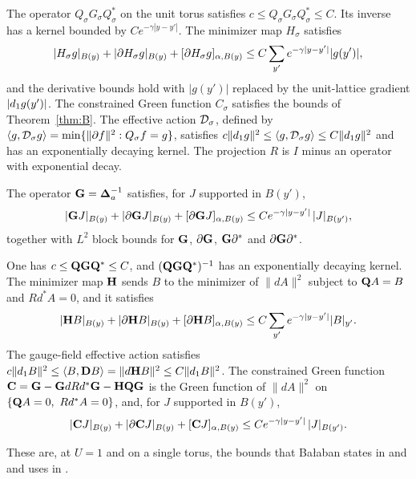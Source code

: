 \begin{maintheorem}\label{thm:C}
The operator $Q_\sigma G_\sigma Q_\sigma^*$ on the unit torus satisfies $c\le Q_\sigma G_\sigma Q_\sigma^*\le C$. Its inverse has a kernel bounded by $Ce^{-\gamma|y-y'|}$. The minimizer map $H_\sigma$ satisfies
\[
|H_\sigma g|_{B(y)}+|\partial H_\sigma g|_{B(y)}+[\partial H_\sigma g]_{\alpha,B(y)}\le C\sum_{y'}e^{-\gamma|y-y'|}|g(y')|,
\]
and the derivative bounds hold with $|g(y')|$ replaced by the unit-lattice gradient $|d_1 g(y')|$. The constrained Green function $C_\sigma$ satisfies the bounds of Theorem~\ref{thm:B}. The effective action $\mathcal D_\sigma$, defined by $\langle g,\mathcal D_\sigma g\rangle=\min\{\|\partial f\|^2:Q_\sigma f=g\}$, satisfies $c\|d_1 g\|^2\le\langle g,\mathcal D_\sigma g\rangle\le C\|d_1 g\|^2$ and has an exponentially decaying kernel. The projection $R$ is $I$ minus an operator with exponential decay.
\end{maintheorem}

\begin{maintheorem}\label{thm:D}
The operator $\mathbf G=\boldsymbol{\Delta}_a^{-1}$ satisfies, for $J$ supported in $B(y')$,
\[
|\mathbf G J|_{B(y)}+|\partial\mathbf G J|_{B(y)}+[\partial\mathbf G J]_{\alpha,B(y)}\le Ce^{-\gamma|y-y'|}\,|J|_{B(y')},
\]
together with $L^2$ block bounds for $\mathbf G$, $\partial\mathbf G$, $\mathbf G\partial^*$ and $\partial\mathbf G\partial^*$.
\end{maintheorem}

\begin{maintheorem}\label{thm:E}
One has $c\le\mathbf Q\mathbf G\mathbf Q^*\le C$, and $(\mathbf Q\mathbf G\mathbf Q^*)^{-1}$ has an exponentially decaying kernel. The minimizer map $\mathbf H$ sends $B$ to the minimizer of $\|dA\|^2$ subject to $\mathbf Q A=B$ and $Rd^*A=0$, and it satisfies
\[
|\mathbf H B|_{B(y)}+|\partial\mathbf H B|_{B(y)}+[\partial\mathbf H B]_{\alpha,B(y)}\le C\sum_{y'}e^{-\gamma|y-y'|}|B|_{y'}.
\]
The gauge-field effective action satisfies $c\|d_1 B\|^2\le\langle B,\mathbf D B\rangle=\|d\mathbf H B\|^2\le C\|d_1 B\|^2$. The constrained Green function $\mathbf C=\mathbf G-\mathbf G dRd^*\mathbf G-\mathbf H\mathbf Q\mathbf G$ is the Green function of $\|dA\|^2$ on $\{\mathbf Q A=0,\ Rd^*A=0\}$, and, for $J$ supported in $B(y')$,
\[
|\mathbf C J|_{B(y)}+|\partial\mathbf C J|_{B(y)}+[\mathbf C J]_{\alpha,B(y)}\le Ce^{-\gamma|y-y'|}\,|J|_{B(y')}.
\]
\end{maintheorem}

These are, at $U=1$ and on a single torus, the bounds that Ba\l aban states in \cite[Sect.~F]{BalPropI} and \cite[Theorems~3.12, 3.13]{BalBackground} and uses in \cite{BalVar}.

